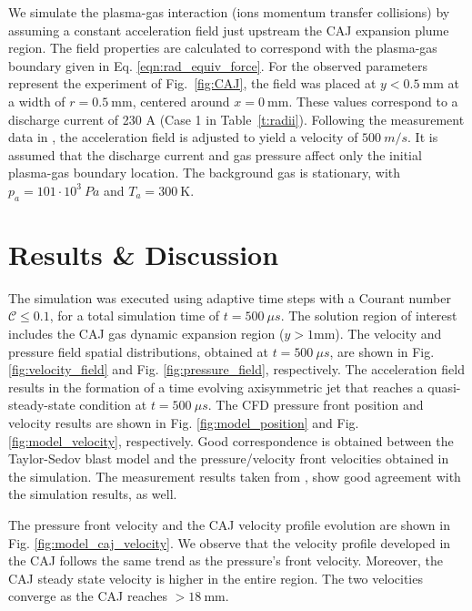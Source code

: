 \documentclass[a4paper]{iacas}%
\begin{document}
We simulate the plasma-gas interaction (ions momentum transfer collisions) by assuming a constant acceleration field just upstream the CAJ expansion plume region. The field properties are calculated to correspond with the plasma-gas boundary given in Eq. \eqref{eqn:rad_equiv_force}. For the observed parameters represent the experiment \cite{KR} of Fig.~\ref{fig:CAJ}, the field was placed at $ y < 0.5~ \mathrm{mm} $ at a width of $r = 0.5~\mathrm{mm}$, centered around $x=0~\mathrm{mm}$. These values correspond to a discharge current of 230 A (Case 1 in Table~\ref{t:radii}).
Following the measurement data in \cite{KRClose}, the acceleration field is adjusted to yield a velocity of $500~ m/s$. It is assumed that the discharge current and gas pressure affect only the initial plasma-gas boundary location. The background gas is stationary, with $p_a = 101\cdot 10^3~Pa$ and $T_a = 300~\mathrm{K}$.

\section{Results \& Discussion}

The simulation was executed using adaptive time steps with a Courant number $\mathcal{C} \leq 0.1$, for a total simulation time of $t = 500~\mu s$. The solution region of interest includes the CAJ gas dynamic expansion region ($ y > 1 \mathrm{mm} $). The velocity and pressure field spatial distributions, obtained at $ t = 500~\mu s $, are shown in Fig. \ref{fig:velocity_field} and Fig. \ref{fig:pressure_field}, respectively. The acceleration field results in the formation of a time evolving axisymmetric jet that reaches a quasi-steady-state condition at $t = 500~\mu s$.
The CFD pressure front position and velocity results are shown in Fig. \ref{fig:model_position} and Fig. \ref{fig:model_velocity}, respectively. Good correspondence is obtained between the Taylor-Sedov blast model and the pressure/velocity front velocities obtained in the simulation. The measurement results taken from \cite{KR}, show good agreement with the simulation results, as well.

The pressure front velocity and the CAJ velocity profile evolution are shown in Fig. \ref{fig:model_caj_velocity}. We observe that the velocity profile developed in the CAJ  follows the same trend as the pressure's front velocity. Moreover, the CAJ steady state velocity is higher in the entire region. The two velocities converge as the CAJ reaches $> 18~\mathrm{mm}$.
\end{document}
